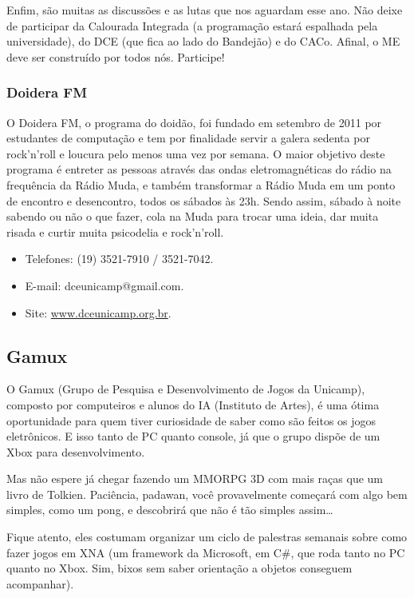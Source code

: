 Enfim, são muitas as discussões e as lutas que nos aguardam esse ano. Não deixe
de participar da Calourada Integrada (a programação estará espalhada pela
universidade), do DCE (que fica ao lado do Bandejão) e do CACo. Afinal, o ME
deve ser construído por todos nós. Participe!

\subsubsection{Doidera FM}

O Doidera FM, o programa do doidão, foi fundado em setembro de 2011 por
estudantes de computação e tem por finalidade servir a galera sedenta por
rock'n'roll e loucura pelo menos uma vez por semana. O maior objetivo deste
programa é entreter as pessoas através das ondas eletromagnéticas do rádio na
frequência da Rádio Muda, e também transformar a Rádio Muda em um ponto de
encontro e desencontro, todos os sábados às 23h. Sendo assim, sábado à noite
sabendo ou não o que fazer, cola na Muda para trocar uma ideia, dar muita risada
e curtir muita psicodelia e rock'n'roll.

\begin{itemize}
\item  Telefones: (19) 3521-7910 / 3521-7042.
\item  E-mail: dceunicamp@gmail.com.
\item  Site: \url{www.dceunicamp.org.br}.
\end{itemize}

\subsection{Gamux}

O Gamux (Grupo de Pesquisa e Desenvolvimento de Jogos da Unicamp), composto por
computeiros e alunos do IA (Instituto de Artes), é uma ótima oportunidade para
quem tiver curiosidade de saber como são feitos os jogos eletrônicos. E isso
tanto de PC quanto console, já que o grupo dispõe de um Xbox para
desenvolvimento.

Mas não espere já chegar fazendo um MMORPG 3D com mais raças que um livro de
Tolkien. Paciência, padawan, você provavelmente começará com algo bem simples,
como um pong, e descobrirá que não é tão simples assim{\dots}

Fique atento, eles costumam organizar um ciclo de palestras semanais sobre como
fazer jogos em XNA (um framework da Microsoft, em C\#, que roda tanto no PC
quanto no Xbox. Sim, bixos sem saber orientação a objetos conseguem acompanhar).


